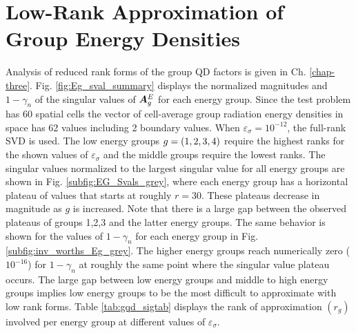 
\section{Low-Rank Approximation of Group Energy Densities} \label{reduced_eg}
	
	Analysis of reduced rank forms of the group QD factors is given in Ch. \ref{chap-three}. Fig. \ref{fig:Eg_sval_summary} displays the normalized magnitudes and $1-\gamma_n$ of the singular values of $\bm{A}^E_g$ for each energy group. Since the test problem has 60 spatial cells the vector of cell-average group radiation energy densities in space has 62 values including 2 boundary values. When $\varepsilon_\sigma=10^{-12}$, the full-rank SVD is used. The low energy groups $g=\left(1,2,3,4\right)$ require the highest ranks for the shown values of $\varepsilon_\sigma$ and the middle groups require the lowest ranks. The singular values normalized to the largest singular value for all energy groups are shown in Fig. \ref{subfig:EG_Svals_grey}, where each energy group has a horizontal plateau of values that starts at roughly $r=30$. These plateaus decrease in magnitude as $g$ is increased. Note that there is a large gap between the observed plateaus of groups 1,2,3 and the latter energy groups. The same behavior is shown for the values of $1-\gamma_n$ for each energy group in Fig. \ref{subfig:inv_worths_Eg_grey}. The higher energy groups reach numerically zero ($10^{-16}$) for $1-\gamma_n$ at roughly the same point where the singular value plateau occurs. The large gap between low energy groups and middle to high energy groups implies low energy groups to be the most difficult to approximate with low rank forms. Table \ref{tab:gqd_sigtab} displays the rank of approximation $(r_g)$ involved per energy group at different values of  $\varepsilon_\sigma$.
	
